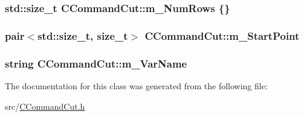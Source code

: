 \subsubsection[{\texorpdfstring{m\+\_\+\+Num\+Rows}{m_NumRows}}]{\setlength{\rightskip}{0pt plus 5cm}std\+::size\+\_\+t C\+Command\+Cut\+::m\+\_\+\+Num\+Rows \{\}\hspace{0.3cm}{\ttfamily [protected]}}\hypertarget{classCCommandCut_ae1021a795aa0ca34697021ed9c68ea33}{}\label{classCCommandCut_ae1021a795aa0ca34697021ed9c68ea33}
\subsubsection[{\texorpdfstring{m\+\_\+\+Start\+Point}{m_StartPoint}}]{\setlength{\rightskip}{0pt plus 5cm}pair$<$std\+::size\+\_\+t, size\+\_\+t$>$ C\+Command\+Cut\+::m\+\_\+\+Start\+Point\hspace{0.3cm}{\ttfamily [protected]}}\hypertarget{classCCommandCut_adbd994d2b9e2620042427235516b446b}{}\label{classCCommandCut_adbd994d2b9e2620042427235516b446b}
\subsubsection[{\texorpdfstring{m\+\_\+\+Var\+Name}{m_VarName}}]{\setlength{\rightskip}{0pt plus 5cm}string C\+Command\+Cut\+::m\+\_\+\+Var\+Name\hspace{0.3cm}{\ttfamily [protected]}}\hypertarget{classCCommandCut_aeb69b9b4f3e1c319de83c2753294e2db}{}\label{classCCommandCut_aeb69b9b4f3e1c319de83c2753294e2db}


The documentation for this class was generated from the following file\+:\begin{DoxyCompactItemize}
\item 
src/\hyperlink{CCommandCut_8h}{C\+Command\+Cut.\+h}\end{DoxyCompactItemize}
